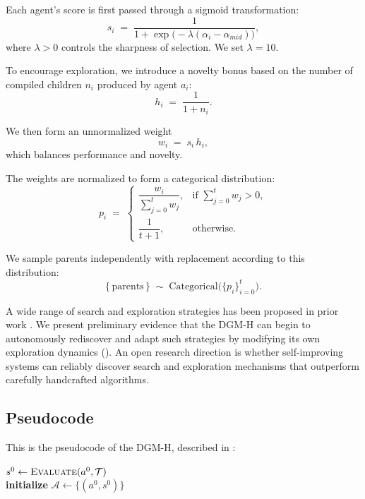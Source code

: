 \documentclass{article}
\begin{document}
Each agent's score is first passed through a sigmoid transformation:
\[
s_i \;=\; \frac{1}{1 + \exp\!\bigl(-\lambda(\alpha_i - \alpha_{mid})\bigr)},
\]
where \(\lambda > 0\) controls the sharpness of selection. We set \(\lambda = 10\).

To encourage exploration, we introduce a novelty bonus based on the number of compiled children \(n_i\) produced by agent \(a_i\):
\[
h_i \;=\; \frac{1}{1 + n_i}.
\]

We then form an unnormalized weight
\[
w_i \;=\; s_i \, h_i,
\]
which balances performance and novelty.

The weights are normalized to form a categorical distribution:
\[
p_i \;=\;
\begin{cases}
\dfrac{w_i}{\sum_{j=0}^t w_j}, & \text{if } \sum_{j=0}^t w_j > 0, \\[10pt]
\dfrac{1}{t+1}, & \text{otherwise}.
\end{cases}
\]

We sample parents independently with replacement according to this distribution:
\[
\{\,\text{parents}\,\}
\;\sim\;
\mathrm{Categorical}\bigl(\{p_i\}_{i=0}^t\bigr).
\]

A wide range of search and exploration strategies has been proposed in prior work \citep{coulom2006efficient, silver2016mastering, herr2025llm, wang2025huxley, weng2026group}. We present preliminary evidence that the DGM-H can begin to autonomously rediscover and adapt such strategies by modifying its own exploration dynamics (). An open research direction is whether self-improving systems can reliably discover search and exploration mechanisms that outperform carefully handcrafted algorithms.

\subsection{Pseudocode}
\label{app:pseudocode}

This is the pseudocode of the DGM-H, described in :

\begin{algorithm}[H]
\DontPrintSemicolon
\SetAlgoLined
{}
\BlankLine
$s^{0} \leftarrow \textsc{Evaluate}(a^{0}, \mathcal{T})$ \\
\textbf{initialize} $\mathcal{A} \leftarrow \{(a^{0}, s^{0})\}$ 
\caption{Darwin G\"odel Machine with Hyperagents (DGM-H)}
\label{algo:DGM-H}
\end{algorithm}
\end{document}
